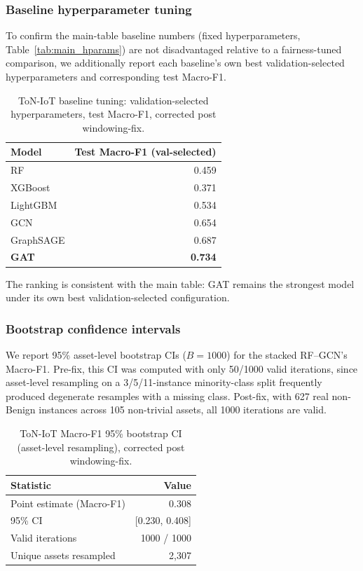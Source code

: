 \documentclass[pdflatex,sn-mathphys-num]{sn-jnl}
\theoremstyle{thmstyleone}%
\theoremstyle{thmstyletwo}%
\theoremstyle{thmstylethree}%
\begin{document}
\subsubsection{Baseline hyperparameter tuning}
\label{subsec:baseline_tuning_corrected}
To confirm the main-table baseline numbers (fixed hyperparameters, Table~\ref{tab:main_hparams}) are not disadvantaged relative to a fairness-tuned comparison, we additionally report each baseline's own best validation-selected hyperparameters and corresponding test Macro-F1.

\begin{table}[!t]
\centering
\caption{ToN-IoT baseline tuning: validation-selected hyperparameters, test Macro-F1, corrected post windowing-fix.}
\label{tab:toniot_baseline_tuning_corrected}
\begin{tabular}{lr}
\toprule
\textbf{Model} & \textbf{Test Macro-F1 (val-selected)} \\
\midrule
RF        & 0.459 \\
XGBoost   & 0.371 \\
LightGBM  & 0.534 \\
GCN       & 0.654 \\
GraphSAGE & 0.687 \\
\textbf{GAT} & \textbf{0.734} \\
\bottomrule
\end{tabular}
\end{table}

The ranking is consistent with the main table: GAT remains the strongest model under its own best validation-selected configuration.

\subsubsection{Bootstrap confidence intervals}
\label{subsec:bootstrap_ci_corrected}
We report 95\% asset-level bootstrap CIs ($B=1000$) for the stacked RF--GCN's Macro-F1. Pre-fix, this CI was computed with only 50/1000 valid iterations, since asset-level resampling on a 3/5/11-instance minority-class split frequently produced degenerate resamples with a missing class. Post-fix, with 627 real non-Benign instances across 105 non-trivial assets, all 1000 iterations are valid.

\begin{table}[!t]
\centering
\caption{ToN-IoT Macro-F1 95\% bootstrap CI (asset-level resampling), corrected post windowing-fix.}
\label{tab:toniot_bootstrap_ci_corrected}
\begin{tabular}{lr}
\toprule
\textbf{Statistic} & \textbf{Value} \\
\midrule
Point estimate (Macro-F1) & 0.308 \\
95\% CI & [0.230, 0.408] \\
Valid iterations & 1000 / 1000 \\
Unique assets resampled & 2{,}307 \\
\bottomrule
\end{tabular}
\end{table}
\end{document}
